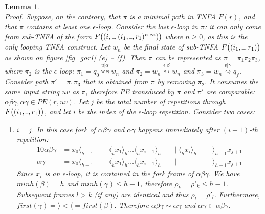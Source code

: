 \documentclass[AMA,STIX1COL]{WileyNJD-v2}
\newcommand{\Xl}{\langle}
\newcommand{\Xr}{\rangle}
\newcommand{\Xund}{\rule{.4em}{.4pt}}
\newtheorem{XLem}{Lemma}
\begin{document}
\begin{XLem}\label{gor1_minpaths}
\lemmaclosureminpaths
\\[0.5em]
    Proof.
    Suppose, on the contrary, that $\pi$ is a minimal path in TNFA $F(r)$, and that $\pi$ contains at least one $\epsilon$-loop.
    Consider the \emph{last} $\epsilon$-loop in $\pi$:
    it can only come from sub-TNFA of the form $F\big( (i, \Xund, (i_1, \Xund, r_1)^{n,\infty}) \big)$ where $n \geq 0$,
    as this is the only looping TNFA construct.
    Let $w_n$ be the final state of sub-TNFA $F\big( (i_1, \Xund, r_1) \big)$
    as shown on figure \ref{fig_gor1} (e) -- (f).
    Then $\pi$ can be represented as
    $\pi = \pi_1 \pi_2 \pi_3$, where $\pi_2$ is the $\epsilon$-loop:
    $\pi_1 = q_0 \overset {u | \alpha} {\rightsquigarrow} w_n$ and
    $\pi_2 = w_n \overset {\epsilon | \beta} {\rightsquigarrow} w_n$ and
    $\pi_3 = w_n \overset {v | \gamma} {\rightsquigarrow} q_f$.
    Consider path $\pi' = \pi_1 \pi_3$ that is obtained from $\pi$ by removing $\pi_2$.
    It consumes the same input string $uv$ as $\pi$,
    therefore PE transduced by $\pi$ and $\pi'$ are comparable: $\alpha \beta \gamma, \alpha \gamma \in PE(r, uv)$.
    Let $j$ be the total number of repetitions through $F\big( (i_1, \Xund, r_1) \big)$,
    and let $i$ be the index of the $\epsilon$-loop repetition.
    Consider two cases:

    \begin{enumerate}[itemsep=0.5em]
    \item[(1)]
    $i = j$.
    In this case fork of $\alpha \beta \gamma$ and $\alpha \gamma$ happens immediately after $(i-1)$-th repetition:
    \begin{alignat*}{10}
        \alpha \beta \gamma &= x_0 \Xl_{h-1} \;&&\; \Xl_h x_1 \Xr_h \hdots \Xl_h x_{i-1} \Xr_h \;&&\big|\; \Xl_h x_{i} \Xr_h \;&&\; \Xr_{h-1} x_{j+1} \\[-0.5em]
        \alpha \gamma       &= x_0 \Xl_{h-1} \;&&\; \Xl_h x_1 \Xr_h \hdots \Xl_h x_{i-1} \Xr_h \;&&\big|\;                   \;&&\; \Xr_{h-1} x_{j+1}
    \end{alignat*}
    Since $x_i$ is an $\epsilon$-loop, it is contained in the fork frame of $\alpha \beta \gamma$.
    We have $minh (\beta) = h$ and $minh (\gamma) \leq h - 1$, therefore $\rho_k = \rho'_k \leq h - 1$.
    Subsequent frames $l > k$ (if any) are identical and thus $\rho_l = \rho'_l$.
    Furthermore, $first (\gamma) = \Xr < \Xl = first (\beta)$.
    Therefore $\alpha \beta \gamma \sim \alpha \gamma$ and $\alpha \gamma \subset \alpha \beta \gamma$.


\end{enumerate}
\end{XLem}
\end{document}
